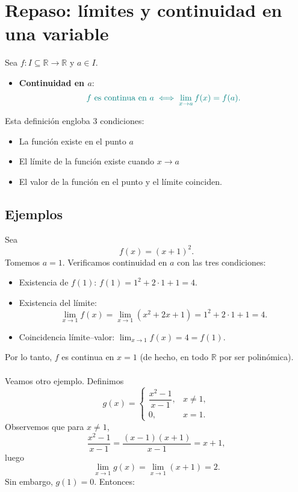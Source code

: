 \documentclass{article}
\begin{document}
\section*{Repaso: límites y continuidad en una variable}
Sea \(f\colon I\subseteq \mathbb{R}\to\mathbb{R}\) y \(a\in I\).
\begin{itemize}

  \item \textbf{{\color{teal}Continuidad en \(a\)}}:
  \[\color{teal}
    f \text{ es continua en } a
    \;\Longleftrightarrow\;
    \lim_{x\to a} f(x)=f(a).
  \]
\end{itemize}
Esta definición engloba 3 condiciones:
\begin{itemize}
    \item {\color{teal} La función existe en el punto $a$ }
    \item{ \color{teal}El límite de la función existe cuando $x\to a$}
    \item {\color{teal}El valor de la función en el punto y el límite coinciden.}
\end{itemize}



\subsection*{Ejemplos}

Sea
\[
f(x)=(x+1)^2.
\]
Tomemos \(a=1\). Verificamos continuidad en \(a\) con las tres condiciones:

\begin{itemize}
  \item {\color{teal}Existencia de \(f(1)\):} \(f(1)=1^{2}+2\cdot1+1=4\).
  \item {\color{teal}Existencia del límite:}
  \[
    \lim_{x\to 1} f(x)=\lim_{x\to 1}(x^{2}+2x+1)
    =1^{2}+2\cdot1+1=4.
  \]
  \item {\color{teal}Coincidencia límite–valor:} \(\displaystyle \lim_{x\to1}f(x)=4=f(1)\).
\end{itemize}

Por lo tanto, {\color{teal}\(f\) es continua en \(x=1\)} (de hecho, en todo \(\mathbb R\) por ser polinómica).  \\
\\
Veamos otro ejemplo. Definimos
\[
g(x)=
\begin{cases}
\dfrac{x^{2}-1}{x-1}, & x\neq 1,\\[6pt]
0, & x=1.
\end{cases}
\]
Observemos que para \(x\neq1\),
\[
\frac{x^{2}-1}{x-1}=\frac{(x-1)(x+1)}{x-1}=x+1,
\]
luego
\[
\lim_{x\to1}g(x)=\lim_{x\to1}(x+1)=2.
\]
Sin embargo, \(g(1)=0\). Entonces:
\end{document}
